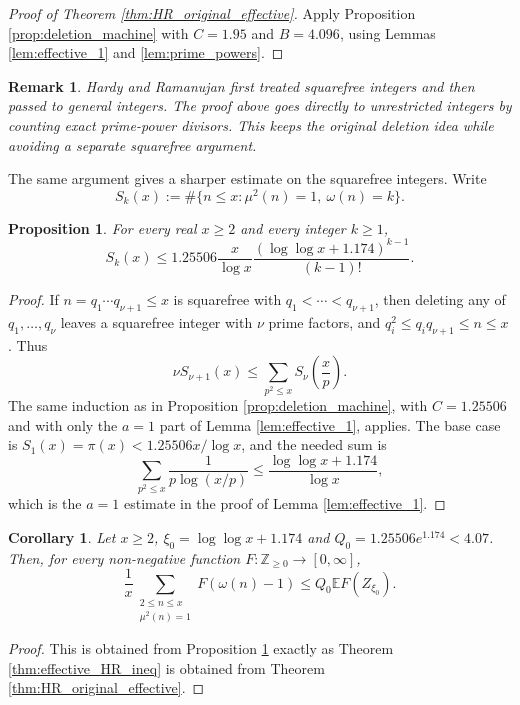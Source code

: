 \documentclass[12pt,a4paper,reqno]{amsart}
\theoremstyle{plain}
\newtheorem{prpstn}[thrm]{Proposition}
\newtheorem{crllry}[thrm]{Corollary}
\newtheorem*{rmk}{Remark}
\numberwithin{sblmm}{thrm}
\numberwithin{equation}{section}
\begin{document}
\begin{proof}[Proof of Theorem \ref{thm:HR_original_effective}]
    Apply Proposition \ref{prop:deletion_machine} with $C=1.95$ and $B=4.096$, using Lemmas \ref{lem:effective_1} and \ref{lem:prime_powers}.
\end{proof}

\begin{rmk}
    Hardy and Ramanujan first treated squarefree integers and then passed to general integers. The proof above goes directly to unrestricted integers by counting exact prime-power divisors. This keeps the original deletion idea while avoiding a separate squarefree argument.
\end{rmk}

The same argument gives a sharper estimate on the squarefree integers. Write
$$S_k(x):=\#\{n\le x:\mu^2(n)=1,\ \omega(n)=k\}.$$

\begin{prpstn}\label{prop:squarefree_counting}
    For every real $x\ge 2$ and every integer $k\ge 1$,
    \begin{equation}\label{eqn:squarefree_counting}
        S_k(x)\le 1.25506\frac{x}{\log x}\frac{(\log\log x+1.174)^{k-1}}{(k-1)!}.
    \end{equation}
\end{prpstn}
\begin{proof}
    If $n=q_1\cdots q_{\nu+1}\le x$ is squarefree with $q_1<\cdots<q_{\nu+1}$, then deleting any of $q_1,\ldots,q_{\nu}$ leaves a squarefree integer with $\nu$ prime factors, and $q_i^2\le q_iq_{\nu+1}\le n\le x$. Thus
    $$\nu S_{\nu+1}(x)\le\sum_{p^2\le x}S_{\nu}\left(\frac{x}{p}\right).$$
    The same induction as in Proposition \ref{prop:deletion_machine}, with $C=1.25506$ and with only the $a=1$ part of Lemma \ref{lem:effective_1}, applies. The base case is $S_1(x)=\pi(x)<1.25506x/\log x$, and the needed sum is
    $$\sum_{p^2\le x}\frac{1}{p\log(x/p)}\le\frac{\log\log x+1.174}{\log x},$$
    which is the $a=1$ estimate in the proof of Lemma \ref{lem:effective_1}.
\end{proof}

\begin{crllry}\label{cor:squarefree_domination}
    Let $x\ge 2$, $\xi_0=\log\log x+1.174$ and $Q_0=1.25506e^{1.174}<4.07$. Then, for every non-negative function $F:\mathbb{Z}_{\ge 0}\to[0,\infty]$,
    \begin{equation}\label{eqn:squarefree_domination}
        \frac{1}{x}\sum_{\substack{2\le n\le x\\ \mu^2(n)=1}}F(\omega(n)-1)\le Q_0\mathbb{E}F(Z_{\xi_0}).
    \end{equation}
\end{crllry}
\begin{proof}
    This is obtained from Proposition \ref{prop:squarefree_counting} exactly as Theorem \ref{thm:effective_HR_ineq} is obtained from Theorem \ref{thm:HR_original_effective}.
\end{proof}
\end{document}
